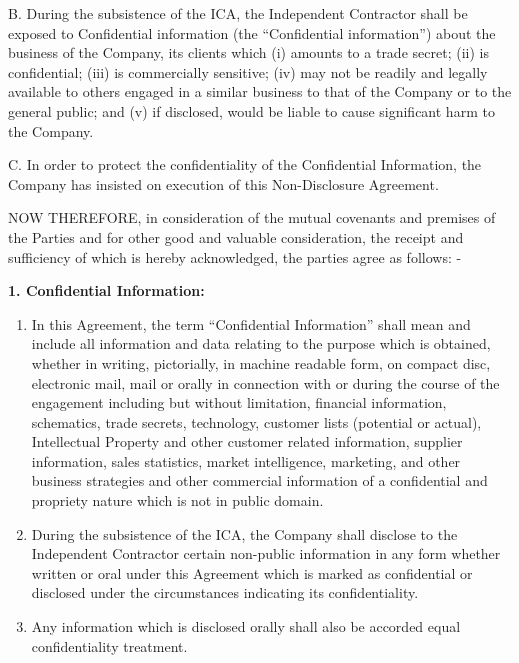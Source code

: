 \documentclass[12pt]{article}
\begin{document}
\vspace{0.5em}
\noindent
B. During the subsistence of the ICA, the Independent Contractor shall be exposed to Confidential information (the ``Confidential information'') about the business of the Company, its clients which (i) amounts to a trade secret; (ii) is confidential; (iii) is commercially sensitive; (iv) may not be readily and legally available to others engaged in a similar business to that of the Company or to the general public; and (v) if disclosed, would be liable to cause significant harm to the Company.

\vspace{0.5em}
\noindent
C. In order to protect the confidentiality of the Confidential Information, the Company has insisted on execution of this Non-Disclosure Agreement.

\vspace{1em}
\noindent
NOW THEREFORE, in consideration of the mutual covenants and premises of the Parties and for other good and valuable consideration, the receipt and sufficiency of which is hereby acknowledged, the parties agree as follows: -

\vspace{1em}
\noindent
\textbf{1. Confidential Information:}
\begin{enumerate}
    \item[i.] In this Agreement, the term ``Confidential Information'' shall mean and include all information and data relating to the purpose which is obtained, whether in writing, pictorially, in machine readable form, on compact disc, electronic mail, mail or orally in connection with or during the course of the engagement including but without limitation, financial information, schematics, trade secrets, technology, customer lists (potential or actual), Intellectual Property and other customer related information, supplier information, sales statistics, market intelligence, marketing, and other business strategies and other commercial information of a confidential and propriety nature which is not in public domain.
    \item[ii.] During the subsistence of the ICA, the Company shall disclose to the Independent Contractor certain non-public information in any form whether written or oral under this Agreement which is marked as confidential or disclosed under the circumstances indicating its confidentiality.
    \item[iii.] Any information which is disclosed orally shall also be accorded equal confidentiality treatment.
\end{enumerate}
\end{document}
